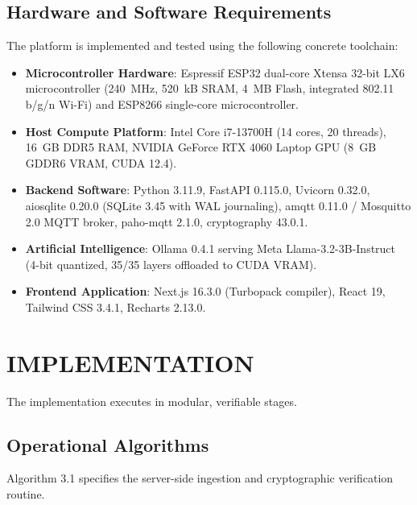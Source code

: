 \documentclass[12pt,a4paper]{report}
\begin{document}
\subsection{Hardware and Software Requirements}
The platform is implemented and tested using the following concrete toolchain:
\begin{itemize}[leftmargin=1.2cm, itemsep=0.3em]
    \item \textbf{Microcontroller Hardware}: Espressif ESP32 dual-core Xtensa 32-bit LX6 microcontroller (240~MHz, 520~kB SRAM, 4~MB Flash, integrated 802.11 b/g/n Wi-Fi) and ESP8266 single-core microcontroller.
    \item \textbf{Host Compute Platform}: Intel Core i7-13700H (14 cores, 20 threads), 16~GB DDR5 RAM, NVIDIA GeForce RTX 4060 Laptop GPU (8~GB GDDR6 VRAM, CUDA 12.4).
    \item \textbf{Backend Software}: Python 3.11.9, FastAPI 0.115.0, Uvicorn 0.32.0, aiosqlite 0.20.0 (SQLite 3.45 with WAL journaling), amqtt 0.11.0 / Mosquitto 2.0 MQTT broker, paho-mqtt 2.1.0, cryptography 43.0.1.
    \item \textbf{Artificial Intelligence}: Ollama 0.4.1 serving Meta Llama-3.2-3B-Instruct (4-bit quantized, 35/35 layers offloaded to CUDA VRAM).
    \item \textbf{Frontend Application}: Next.js 16.3.0 (Turbopack compiler), React 19, Tailwind CSS 3.4.1, Recharts 2.13.0.
\end{itemize}

\section{IMPLEMENTATION}
The implementation executes in modular, verifiable stages.

\subsection{Operational Algorithms}
Algorithm 3.1 specifies the server-side ingestion and cryptographic verification routine.
\end{document}
